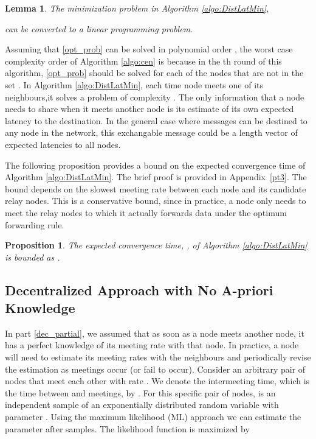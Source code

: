 \documentclass[journal,onecolumn,11pt]{IEEEtran}
\theoremstyle{plain}
\newtheorem{lemma}{Lemma}
\newtheorem{proposition}{Proposition}
\theoremstyle{definition}
\begin{document}
\begin{lemma} \label{lem2}
The minimization problem in Algorithm \ref{algo:DistLatMin},

can be converted to a linear programming problem.
\end{lemma}
Assuming that \eqref{opt_prob} can be solved in polynomial order
, the worst case complexity order of Algorithm
\ref{algo:cen} is  because in the th round of this
algorithm, \eqref{opt_prob} should be solved for each of the 
nodes that are not in the set . In Algorithm
\ref{algo:DistLatMin}, each time node  meets one of its
neighbours,it solves a problem of complexity . The only
information that a node needs to share when it meets another node is
its estimate of its own expected latency to the destination. In the
general case where messages can be destined to any node in the
network, this exchangable message could be a length  vector of
expected latencies to all nodes.

The following proposition provides a
bound on the expected convergence time of Algorithm
\ref{algo:DistLatMin}. The brief proof is provided in
Appendix~\ref{pt3}. The bound depends on the slowest meeting rate
between each node and its candidate relay nodes. This is a
conservative bound, since in practice, a node only needs to meet the
relay nodes to which it actually forwards data under the optimum forwarding rule.
\begin{proposition}\label{prop1}
The expected convergence time, , of Algorithm
\ref{algo:DistLatMin} is bounded as 
.
\end{proposition}

\subsection{Decentralized Approach with No A-priori Knowledge}\label{est}
In part \ref{dec_partial}, we assumed that as soon as a node meets
another node, it has a perfect knowledge of its meeting rate with that
node. In practice, a node will need to estimate its meeting rates with
the neighbours and periodically revise the estimation as meetings
occur (or fail to occur).
Consider an arbitrary pair of nodes that meet each other with rate
. We denote the  intermeeting time, which is
the time between  and  meetings, by
. For this specific pair of nodes,  is an independent
sample of an exponentially distributed random variable with parameter
. Using the maximum likelihood (ML) approach we can estimate the
parameter  after  samples. The
likelihood function  is maximized by 
\end{document}
